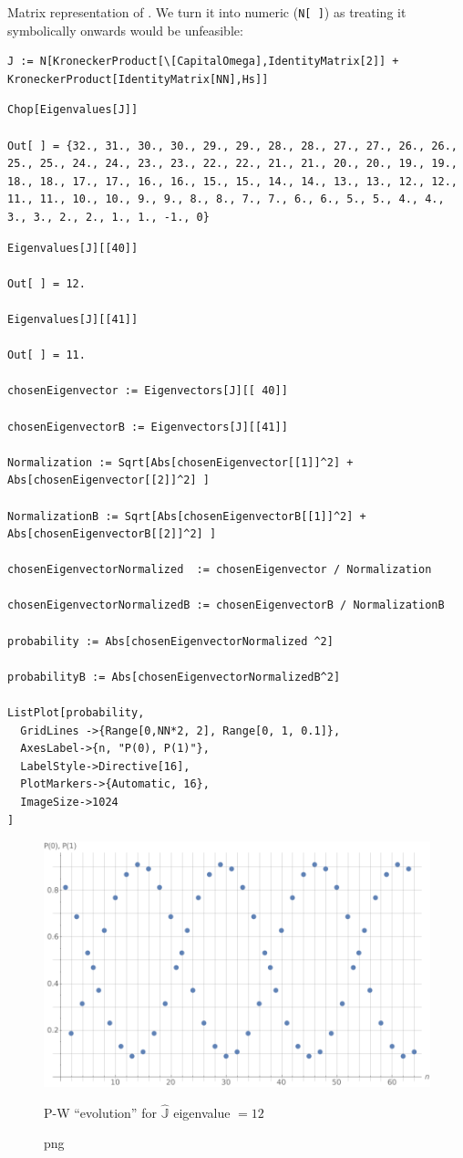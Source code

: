 Matrix representation of \cite[eq. 1]{Lloyd:Time}.
We turn it into numeric (\verb!N[ ]!) as treating  it symbolically onwards would be unfeasible:
\begin{Verbatim}
J := N[KroneckerProduct[\[CapitalOmega],IdentityMatrix[2]] + KroneckerProduct[IdentityMatrix[NN],Hs]]
\end{Verbatim}
\begin{Verbatim}
Chop[Eigenvalues[J]]

Out[ ] = {32., 31., 30., 30., 29., 29., 28., 28., 27., 27., 26., 26., 25., 25., 24., 24., 23., 23., 22., 22., 21., 21., 20., 20., 19., 19., 18., 18., 17., 17., 16., 16., 15., 15., 14., 14., 13., 13., 12., 12., 11., 11., 10., 10., 9., 9., 8., 8., 7., 7., 6., 6., 5., 5., 4., 4., 3., 3., 2., 2., 1., 1., -1., 0}
\end{Verbatim}
\begin{Verbatim}
Eigenvalues[J][[40]]

Out[ ] = 12.

Eigenvalues[J][[41]]

Out[ ] = 11.

chosenEigenvector := Eigenvectors[J][[ 40]]

chosenEigenvectorB := Eigenvectors[J][[41]]

Normalization := Sqrt[Abs[chosenEigenvector[[1]]^2] + Abs[chosenEigenvector[[2]]^2] ]

NormalizationB := Sqrt[Abs[chosenEigenvectorB[[1]]^2] + Abs[chosenEigenvectorB[[2]]^2] ]

chosenEigenvectorNormalized  := chosenEigenvector / Normalization

chosenEigenvectorNormalizedB := chosenEigenvectorB / NormalizationB  

probability := Abs[chosenEigenvectorNormalized ^2]

probabilityB := Abs[chosenEigenvectorNormalizedB^2]

ListPlot[probability,
  GridLines ->{Range[0,NN*2, 2], Range[0, 1, 0.1]},
  AxesLabel->{n, "P(0), P(1)"},
  LabelStyle->Directive[16],
  PlotMarkers->{Automatic, 16},
  ImageSize->1024
]
\end{Verbatim}
\begin{figure}[!h]
  \centering
  \includegraphics[width=.75\textwidth]{img/N32.png}
  \caption[]{png}{P-W ``evolution'' for $\hat{\mathbb{J}}$ eigenvalue $=12$}
\end{figure}  
